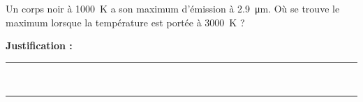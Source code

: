 Un corps noir à \qty{1000}{K} a son maximum d'émission à \qty{2.9}{\micro\metre}. Où se trouve le maximum lorsque la température est portée à \qty{3000}{K} ?

\choices

\noindent\textbf{Justification :} \hrulefill \\[2.5ex]
\rule{\linewidth}{0.4pt} \\[2.5ex]
\rule{\linewidth}{0.4pt}
\vfill
